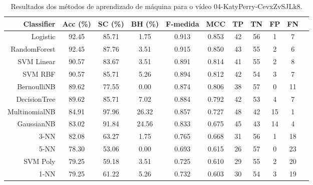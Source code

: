 \begin{table}[!htb]
\centering
\caption{Resultados dos métodos de aprendizado de máquina para o vídeo 04-KatyPerry-CevxZvSJLk8.}
\label{tab:04-KatyPerry-CevxZvSJLk8}
\begin{tabular}{r|c|c|c|c|c|c|c|c|c|c}
\hline\hline
Classifier & Acc (\%) & SC (\%) & BH (\%) & F-medida & MCC & TP & TN & FP & FN \\ \hline
Logistic & 92.45 & 85.71 & 1.75 & 0.913 & 0.853 & 42 & 56 & 1 & 7 \\ 
RandomForest & 92.45 & 87.76 & 3.51 & 0.915 & 0.850 & 43 & 55 & 2 & 6 \\ 
SVM Linear & 90.57 & 83.67 & 3.51 & 0.891 & 0.814 & 41 & 55 & 2 & 8 \\ 
SVM RBF & 90.57 & 85.71 & 5.26 & 0.894 & 0.812 & 42 & 54 & 3 & 7 \\ 
BernoulliNB & 89.62 & 77.55 & 0.00 & 0.874 & 0.806 & 38 & 57 & 0 & 11 \\ 
DecisionTree & 89.62 & 85.71 & 7.02 & 0.884 & 0.792 & 42 & 53 & 4 & 7 \\ 
MultinomialNB & 84.91 & 97.96 & 26.32 & 0.857 & 0.727 & 48 & 42 & 15 & 1 \\ 
GaussianNB & 83.02 & 91.84 & 24.56 & 0.833 & 0.675 & 45 & 43 & 14 & 4 \\ 
3-NN & 82.08 & 63.27 & 1.75 & 0.765 & 0.668 & 31 & 56 & 1 & 18 \\ 
5-NN & 78.30 & 53.06 & 0.00 & 0.693 & 0.615 & 26 & 57 & 0 & 23 \\ 
SVM Poly & 79.25 & 59.18 & 3.51 & 0.725 & 0.610 & 29 & 55 & 2 & 20 \\ 
1-NN & 79.25 & 61.22 & 5.26 & 0.732 & 0.603 & 30 & 54 & 3 & 19 \\ 
\hline\hline
\end{tabular}
\end{table}
